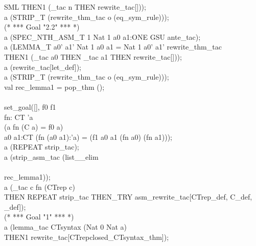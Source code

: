 {\begin{GFT}{SML}
\+	THEN1 (\MMM{\exists}\_tac \PrKM{}n\PrKO{} THEN rewrite\_tac[]));\\
\+a (STRIP\_T (rewrite\_thm\_tac o (eq\_sym\_rule)));\\
\+(* *** Goal "2.2" *** *)\\
\+a (SPEC\_NTH\_ASM\_T 1 \PrKM{}Nat 1 \MMM{\mapsto} a0 \MMM{\mapsto} a1:ONE GSU\PrKO{} ante\_tac);\\
\+a (LEMMA\_T \PrKM{}\MMM{\exists} a0' a1'\MMM{\bullet} Nat 1 \MMM{\mapsto} a0 \MMM{\mapsto} a1 = Nat 1 \MMM{\mapsto} a0' \MMM{\mapsto} a1'\PrKO{} rewrite\_thm\_tac\\
\+	THEN1 (\MMM{\exists}\_tac \PrKM{}a0\PrKO{} THEN \MMM{\exists}\_tac \PrKM{}a1\PrKO{} THEN rewrite\_tac[]));\\
\+a (rewrite\_tac[let\_def]);\\
\+a (STRIP\_T (rewrite\_thm\_tac o (eq\_sym\_rule)));\\
\+val rec\_lemma1 = pop\_thm ();\\
\+\\
\+set\_goal([], \PrKM{}\MMM{\forall}f0 f1\MMM{\bullet}\\
\+         \MMM{\exists}fn: CT \MMM{\rightarrow} 'a\MMM{\bullet}\\
\+           (\MMM{\forall}a\MMM{\bullet} fn (C a) = f0 a) \MMM{\land}\\
\+           \MMM{\forall}a0 a1:CT\MMM{\bullet} (fn (a0  a1):'a) = (f1 a0 a1 (fn a0) (fn a1))\PrKO{});\\
\+a (REPEAT strip\_tac);\\
\+a (strip\_asm\_tac (list\_\MMM{\forall}\_elim\\
\+	[\PrKM{}\MMM{\lambda}c:ONE GSU\MMM{\bullet} f0 (\MMM{\epsilon}n\MMM{\bullet} Nat\PrIJ{u} n = c)\PrKO{},\\
\+	\PrKM{}\MMM{\lambda}a0 a1 fa0 fa1\MMM{\bullet} f1 (CTabs a0) (CTabs a1) fa0 fa1\PrKO{}]\\
\+ rec\_lemma1));\\
\+a (\MMM{\exists}\_tac \PrKM{}\MMM{\lambda}c\MMM{\bullet} fn (CTrep c)\PrKO{}\\
\+	THEN REPEAT strip\_tac THEN\_TRY asm\_rewrite\_tac[CTrep\_def, C\_def, \_def]);\\
\+(* *** Goal "1" *** *)\\
\+a (lemma\_tac \PrKM{}CTsyntax (Nat 0 \MMM{\mapsto} Nat a)\PrKO{}\\
\+	THEN1 rewrite\_tac[CTrepclosed\_CTsyntax\_thm]);\\

\end{GFT}}
